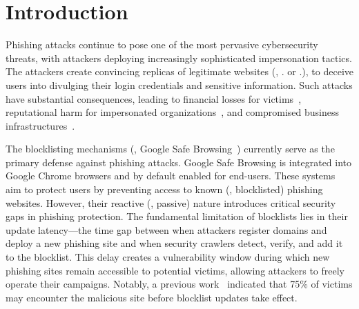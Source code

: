 \section{Introduction}
\label{sec:intro}

Phishing attacks continue to pose one of the most pervasive cybersecurity threats, with attackers deploying increasingly sophisticated impersonation tactics. 
The attackers create convincing replicas of legitimate websites (\eg, . or .), to deceive users into divulging their login credentials and sensitive information.
Such attacks have substantial consequences, leading to financial losses for victims~\cite{IC3_Report_2024}, reputational harm for impersonated organizations~\cite{Reputational_damages}, and compromised business infrastructures~\cite{moura2024characterizing}.




The blocklisting mechanisms (\eg, Google Safe Browsing~\cite{SafeBrow22:online}) currently serve as the primary defense against phishing attacks.
Google Safe Browsing is integrated into Google Chrome browsers and by default enabled for end-users.
These systems aim to protect users by preventing access to known (\ie, blocklisted) phishing websites. 
However, their reactive (\ie, passive) nature introduces critical security gaps in phishing protection.
The fundamental limitation of blocklists lies in their update latency---the time gap between when attackers register domains and deploy a new phishing site and when security crawlers detect, verify, and add it to the blocklist.
This delay creates a vulnerability window during which new phishing sites remain accessible to potential victims, allowing attackers to freely operate their campaigns.
Notably, a previous work~\cite{oest2020sunrise} indicated that 75\% of victims may encounter the malicious site before blocklist updates take effect.

